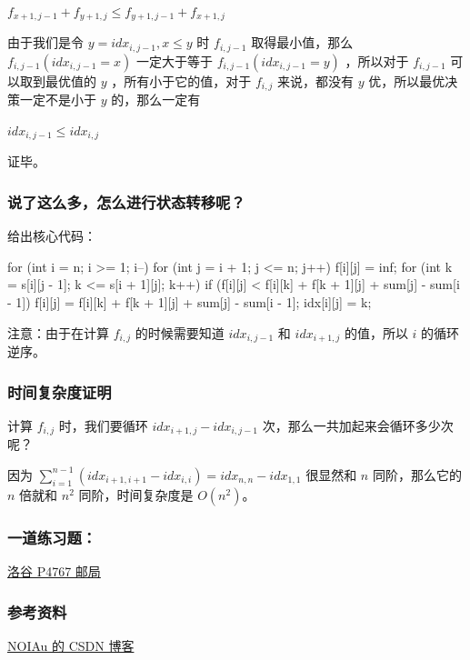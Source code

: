 $f_{x+1,j-1}+f_{y+1,j}\le f_{y+1,j-1}+f_{x+1,j}$

由于我们是令 $y=idx_{i,j-1},x\le y$ 时 $f_{i,j-1}$ 取得最小值，那么 $f_{i,j-1}(idx_{i,j-1}=x)$ 一定大于等于 $f_{i,j-1}(idx_{i,j-1}=y)$ ，所以对于 $f_{i,j-1}$ 可以取到最优值的 $y$ ，所有小于它的值，对于 $f_{i,j}$ 来说，都没有 $y$ 优，所以最优决策一定不是小于 $y$ 的，那么一定有 

$idx_{i,j-1}\le idx_{i,j}$ 

证毕。

\subsubsection{说了这么多，怎么进行状态转移呢？}

给出核心代码：

\begin{cppcode}
for (int i = n; i >= 1; i--) {
  for (int j = i + 1; j <= n; j++) {
    f[i][j] = inf;
    for (int k = s[i][j - 1]; k <= s[i + 1][j]; k++) {
      if (f[i][j] < f[i][k] + f[k + 1][j] + sum[j] - sum[i - 1]) {
        f[i][j] = f[i][k] + f[k + 1][j] + sum[j] - sum[i - 1];
        idx[i][j] = k;
      }
    }
  }
}
\end{cppcode}

注意：由于在计算 $f_{i,j}$ 的时候需要知道 $idx_{i,j-1}$ 和 $idx_{i+1,j}$ 的值，所以 $i$ 的循环逆序。

\subsubsection{时间复杂度证明}

计算 $f_{i,j}$ 时，我们要循环 $idx_{i+1,j}-idx_{i,j-1}$ 次，那么一共加起来会循环多少次呢？

因为 $\sum_{i=1}^{n-1}(idx_{i+1,i+1}-idx_{i,i})=idx_{n,n}-idx_{1,1}$ 很显然和 $n$ 同阶，那么它的 $n$ 倍就和 $n^2$ 同阶，时间复杂度是 $O(n^2)$。

\subsubsection{一道练习题：}

\href{https://www.luogu.org/problemnew/show/P4767}{洛谷 P4767 邮局}

\subsubsection{参考资料}

\href{https://blog.csdn.net/noiau/article/details/72514812}{NOIAu 的 CSDN 博客}
